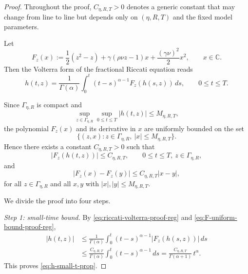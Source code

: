 \documentclass[letterpaper]{article}
\numberwithin{equation}{section}
\theoremstyle{definition}
\theoremstyle{remark}
\newcommand{\C}{\mathbb{C}}
\begin{document}
\begin{proof}
Throughout the proof, $C_{\eta,R,T}>0$ denotes a generic constant that may
change from line to line but depends only on $(\eta,R,T)$ and the fixed model
parameters.

Let
\[
  F_z(x):=\frac12(z^2-z)+\gamma(\rho\nu z-1)x+\frac{(\gamma\nu)^2}{2}x^2,
  \qquad x\in\C.
\]
Then the Volterra form of the fractional Riccati equation reads
\begin{equation}\label{eq:riccati-volterra-proof-reg}
  h(t,z)
  =
  \frac{1}{\Gamma(\alpha)}
  \int_0^t (t-s)^{\alpha-1}F_z(h(s,z))\,ds,
  \qquad 0\le t\le T.
\end{equation}

Since $\Gamma_{\eta,R}$ is compact and
\[
  \sup_{z\in\Gamma_{\eta,R}}\sup_{0\le t\le T}|h(t,z)|
  \le M_{\eta,R,T},
\]
the polynomial $F_z(x)$ and its derivative in $x$ are uniformly bounded on the
set
\[
  \{(z,x): z\in\Gamma_{\eta,R},\ |x|\le M_{\eta,R,T}\}.
\]
Hence there exists a constant $C_{\eta,R,T}>0$ such that
\begin{equation}\label{eq:F-uniform-bound-proof-reg}
  |F_z(h(t,z))|\le C_{\eta,R,T},
  \qquad
  0\le t\le T,\ z\in\Gamma_{\eta,R},
\end{equation}
and
\begin{equation}\label{eq:F-lipschitz-proof-reg}
  |F_z(x)-F_z(y)|\le C_{\eta,R,T}|x-y|,
\end{equation}
for all $z\in\Gamma_{\eta,R}$ and all $x,y$ with $|x|,|y|\le M_{\eta,R,T}$.

We divide the proof into four steps.

\medskip
\noindent
\textit{Step 1: small-time bound.}
By \eqref{eq:riccati-volterra-proof-reg} and \eqref{eq:F-uniform-bound-proof-reg},
\begin{align*}
  |h(t,z)|
  &\le
  \frac{1}{\Gamma(\alpha)}
  \int_0^t (t-s)^{\alpha-1}|F_z(h(s,z))|\,ds\\
  &\le
  \frac{C_{\eta,R,T}}{\Gamma(\alpha)}
  \int_0^t (t-s)^{\alpha-1}\,ds
  =
  \frac{C_{\eta,R,T}}{\Gamma(\alpha+1)}\,t^\alpha.
\end{align*}
This proves \eqref{eq:h-small-t-prop}.


\end{proof}
\end{document}
